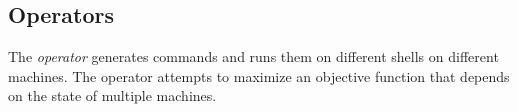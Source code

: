 \subsection{Operators}
\label{operator}

The \emph{operator} generates commands and runs them on different shells on different machines. The operator attempts to maximize an objective function that depends on the state of multiple machines. 